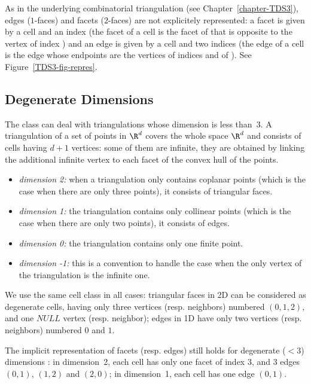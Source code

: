 As in the underlying combinatorial triangulation (see
Chapter~\ref{chapter-TDS3}), edges ($1$-faces) and facets ($2$-faces)
are not explicitely 
represented: a facet is given by a cell and an index (the facet
 of a cell  is the facet of  that is opposite to
the vertex of index ) and an edge is given by a cell and two
indices (the edge  of a cell  is the edge whose
endpoints are the vertices of indices  and  of
). See Figure~\ref{TDS3-fig-repres}.

\subsection{Degenerate Dimensions}
\label{Triangulation3-sec-degen_dim}

The class  can deal with
triangulations whose dimension is less than~3. A triangulation of a
set of points in $\R^d$ covers the whole space $\R^d$ and consists of
cells having $d+1$ vertices: some of them are infinite, they are
obtained by linking the additional infinite vertex to each facet of
the convex hull of the points.
\begin{itemize}
\item {} \emph{dimension 2:} when a triangulation only contains
coplanar points (which is the case when there are only three points), 
it consists of triangular faces.
\item {} \emph{dimension 1:} the triangulation contains only collinear 
points (which is the case when there are only two points), it consists
of edges.
\item {} \emph{dimension 0:} the triangulation contains only one
finite point.
\item {} \emph{dimension -1:} this is a convention to handle the case
when the only vertex of the triangulation is the infinite one.
\end{itemize} 

We use the same cell class in all cases: triangular faces in
2D can be considered as degenerate cells, having only three vertices
(resp. neighbors)
numbered $(0,1,2)$, and one $NULL$ vertex (resp. neighbor);
edges in 1D have only two vertices (resp. neighbors) numbered $0$ and $1$. 

The implicit representation of facets (resp. edges) still holds
for degenerate ($< 3$) dimensions : in dimension~2, each cell has only one
facet of index 3, and 3 edges $(0,1)$, $(1,2)$ and $(2,0)$; in
dimension~1, each cell has one edge $(0,1)$. 

